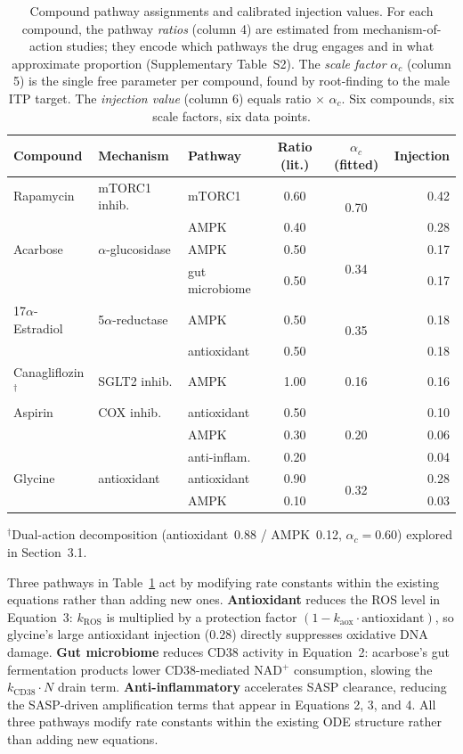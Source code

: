 \documentclass[11pt]{article}
\begin{document}
\begin{table}[ht]
\centering
\caption{Compound pathway assignments and calibrated injection values. For each compound, the pathway \emph{ratios} (column 4) are estimated from mechanism-of-action studies; they encode which pathways the drug engages and in what approximate proportion (Supplementary Table~S2). The \emph{scale factor} $\alpha_c$ (column 5) is the single free parameter per compound, found by root-finding to the male ITP target. The \emph{injection value} (column 6) equals ratio $\times$ $\alpha_c$. Six compounds, six scale factors, six data points.}
\label{tab:compounds}
\begin{tabular}{@{}lllccr@{}}
\toprule
Compound & Mechanism & Pathway & Ratio (lit.) & $\alpha_c$ (fitted) & Injection \\
\midrule
Rapamycin & mTORC1 inhib. & mTORC1 & 0.60 & \multirow{2}{*}{0.70} & 0.42 \\
 & & AMPK & 0.40 & & 0.28 \\ \hline
Acarbose & $\alpha$-glucosidase & AMPK & 0.50 & \multirow{2}{*}{0.34} & 0.17 \\
 & & gut microbiome & 0.50 & & 0.17 \\ \hline
17$\alpha$-Estradiol & 5$\alpha$-reductase & AMPK & 0.50 & \multirow{2}{*}{0.35} & 0.18 \\
 & & antioxidant & 0.50 & & 0.18 \\ \hline
Canagliflozin$^\dagger$ & SGLT2 inhib. & AMPK & 1.00 & 0.16 & 0.16 \\ \hline
Aspirin & COX inhib. & antioxidant & 0.50 & \multirow{3}{*}{0.20} & 0.10 \\
 & & AMPK & 0.30 & & 0.06 \\
 & & anti-inflam. & 0.20 & & 0.04 \\ \hline
Glycine & antioxidant & antioxidant & 0.90 & \multirow{2}{*}{0.32} & 0.28 \\
 & & AMPK & 0.10 & & 0.03 \\
\bottomrule
\end{tabular}
\vspace{2pt}
{\small $^\dagger$Dual-action decomposition (antioxidant~0.88 / AMPK~0.12, $\alpha_c = 0.60$) explored in Section~3.1.}
\end{table}

Three pathways in Table~\ref{tab:compounds} act by modifying rate constants within the existing equations rather than adding new ones. \textbf{Antioxidant} reduces the ROS level in Equation~3: $k_{\text{ROS}}$ is multiplied by a protection factor $(1 - k_{\text{aox}} \cdot \text{antioxidant})$, so glycine's large antioxidant injection (0.28) directly suppresses oxidative DNA damage. \textbf{Gut microbiome} reduces CD38 activity in Equation~2: acarbose's gut fermentation products lower CD38-mediated NAD$^+$ consumption, slowing the $k_{\text{CD38}} \cdot N$ drain term. \textbf{Anti-inflammatory} accelerates SASP clearance, reducing the SASP-driven amplification terms that appear in Equations 2, 3, and 4. All three pathways modify rate constants within the existing ODE structure rather than adding new equations.
\end{document}
